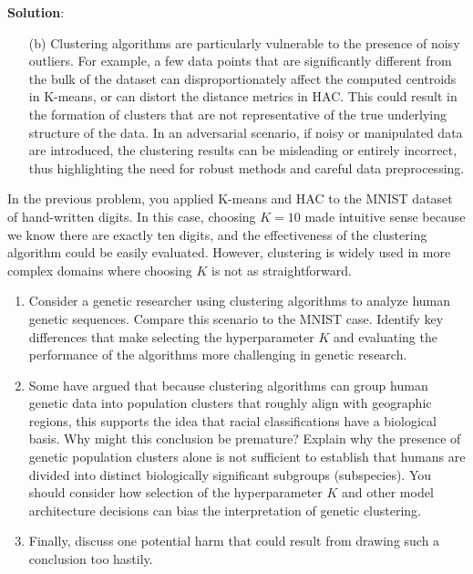 \documentclass[submit]{../harvardml}
\newenvironment{solution}{
    \vspace{2mm}
    \color{blue}\noindent\textbf{Solution}:
}{}
\begin{document}
\begin{solution}
\begin{enumerate}
  \item[(b)] Clustering algorithms are particularly vulnerable to the presence of noisy outliers. For example, a few data points that are significantly different from the bulk of the dataset can disproportionately affect the computed centroids in K-means, or can distort the distance metrics in HAC. This could result in the formation of clusters that are not representative of the true underlying structure of the data. In an adversarial scenario, if noisy or manipulated data are introduced, the clustering results can be misleading or entirely incorrect, thus highlighting the need for robust methods and careful data preprocessing.
\end{enumerate}

\end{solution}

\newpage

\begin{problem}

In the previous problem, you applied K-means and HAC to the MNIST dataset of hand-written digits. In this case, choosing $K=10$ made intuitive sense because we know there are exactly ten digits, and the effectiveness of the clustering algorithm could be easily evaluated. However, clustering is widely used in more complex domains where choosing $K$ is not as straightforward.
\begin{enumerate}
  \item Consider a genetic researcher using clustering algorithms to analyze human genetic sequences. Compare this scenario to the MNIST case. Identify key differences that make selecting the hyperparameter $K$ and evaluating the performance of the algorithms more challenging in genetic research.
  
  \item Some have argued that because clustering algorithms can group human genetic data into population clusters that roughly align with geographic regions, this supports the idea that racial classifications have a biological basis. Why might this conclusion be premature? Explain why the presence of genetic population clusters alone is not sufficient to establish that humans are divided into distinct biologically significant subgroups (subspecies). You should consider how selection of the hyperparameter $K$ and other model architecture decisions can bias the interpretation of genetic clustering.
  
  \item Finally, discuss one potential harm that could result from drawing such a conclusion too hastily.
\end{enumerate}
\end{problem}
\end{document}
